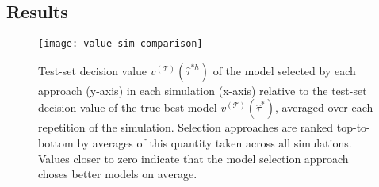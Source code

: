 
\begin{comment}
We also calculate these using the true model $\hat\tau = \tau$, which represents the best achievable performance without specifying any models a-priori:

\[
\tau MSE^{(\mathcal{T})}_{**} = 0
\]

\[
v^{(\mathcal{T})}_{**} = \frac{1}{|\mathcal{T}|}\sum_{i \in \mathcal{T}} \mu_{ d(x_i)}(x_i)
\]

We use these minima to calculate the improvements obtained by each model selection approach relative to optimal baselines, which allows for comparison between different simulations. The relative values of $\tau MSE^{(\mathcal{T})}_{h}$ and $C^{(\mathcal{T})}_{h}$ within one test set and one set of models are

\[
	R\text{-} \tau MSE^{(\mathcal{T})}_{h} = 
	\frac{\tau MSE^{(\mathcal{T})}_{h} - \tau MSE^{(\mathcal{T})}_{**}}{\tau MSE^{(\mathcal{T})}_{*} - \tau MSE^{(\mathcal{T})}_{**}}
\]

\[
	R\text{-}  v^{(\mathcal{T})}_{h} = 
	\frac{ v^{(\mathcal{T})}_{h} -  v^{(\mathcal{T})}_{**}}{ v^{(\mathcal{T})}_{*} -  v^{(\mathcal{T})}_{**}}
\]

The closer to zero these are, the better the performance of the model selection method.
\end{comment}

\subsection{Results}

\begin{figure}
\centering
\texttt{[image: value-sim-comparison]}
\caption{Test-set decision value $v^{(\mathcal T)}(\hat\tau^{*h})$ of the model selected by each approach (y-axis) in each simulation (x-axis) relative to the test-set decision value of the true best model $v^{(\mathcal T)}(\hat\tau^{*})$, averaged over each repetition of the simulation. Selection approaches are ranked top-to-bottom by averages of this quantity taken across all simulations. Values closer to zero indicate that the model selection approach choses better models on average.}
\end{figure}

